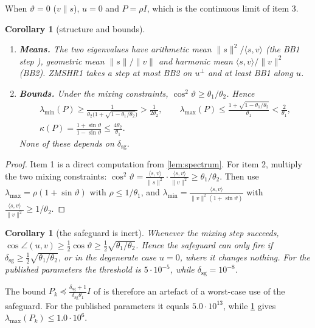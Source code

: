 \documentclass[11pt]{article}
\newtheorem{corollary}[theorem]{Corollary}
\theoremstyle{definition}
\theoremstyle{remark}
\newcommand{\inner}[2]{\langle #1,#2\rangle}
\newcommand{\norm}[1]{\lVert #1\rVert}
\newcommand{\lmin}{\lambda_{\min}}
\newcommand{\lmax}{\lambda_{\max}}
\newcommand{\dsg}{\delta_{\mathrm{sg}}}
\begin{document}
When $\vartheta=0$ ($v\parallel s$), $u=0$ and $P=\rho I$, which is the continuous limit of item 3.

\begin{corollary}[structure and bounds]\label{cor:bounds}
\begin{enumerate}
\item \textbf{Means.} The two eigenvalues have arithmetic mean $\norm s^2/\inner sv$ (the BB1 step
  \cite{barzilai1988}), geometric mean $\norm s/\norm v$ and harmonic mean $\inner sv/\norm v^2$ (BB2). ZMSHR1
  takes a step at most BB2 on $u^\perp$ and at least BB1 along $u$.
\item \textbf{Bounds.} Under the mixing constraints, $\cos^2\vartheta\geq\theta_1/\theta_2$. Hence
  \begin{gather*}
  \lmin(P)\geq\frac{1}{\theta_2\big(1+\sqrt{1-\theta_1/\theta_2}\big)}>\frac1{2\theta_2},\qquad
  \lmax(P)\leq\frac{1+\sqrt{1-\theta_1/\theta_2}}{\theta_1}<\frac2{\theta_1},\\
  \kappa(P)=\frac{1+\sin\vartheta}{1-\sin\vartheta}\leq\frac{4\theta_2}{\theta_1}.
  \end{gather*}
  None of these depends on $\dsg$.
\end{enumerate}
\end{corollary}
\begin{proof}
Item 1 is a direct computation from \cref{lem:spectrum}. For item 2, multiply the two mixing constraints:
$\cos^2\vartheta=\frac{\inner sv}{\norm s^2}\cdot\frac{\inner sv}{\norm v^2}\geq\theta_1/\theta_2$. Then use
$\lmax=\rho(1+\sin\vartheta)$ with $\rho\leq1/\theta_1$, and $\lmin=\frac{\inner sv}{\norm v^2(1+\sin\vartheta)}$ with
$\frac{\inner sv}{\norm v^2}\geq1/\theta_2$.
\end{proof}

\begin{corollary}[the safeguard is inert]\label{cor:inert}
Whenever the mixing step succeeds, $\cos\angle(u,v)\geq\tfrac12\cos\vartheta\geq\tfrac12\sqrt{\theta_1/\theta_2}$.
Hence the safeguard can only fire if $\dsg\geq\frac12\sqrt{\theta_1/\theta_2}$, or in the degenerate case $u=0$,
where it changes nothing. For the published parameters the threshold is $5\cdot10^{-5}$, while $\dsg=10^{-8}$.
\end{corollary}

The bound $P_k\preceq\frac{\dsg+1}{\dsg\theta_1}I$ of \cite[Lemma~1]{hong2024p2np} is therefore an artefact of a
worst-case use of the safeguard. For the published parameters it equals $5.0\cdot10^{13}$, while
\cref{cor:bounds} gives $\lmax(P_k)\leq1.0\cdot10^{6}$.
\end{document}
